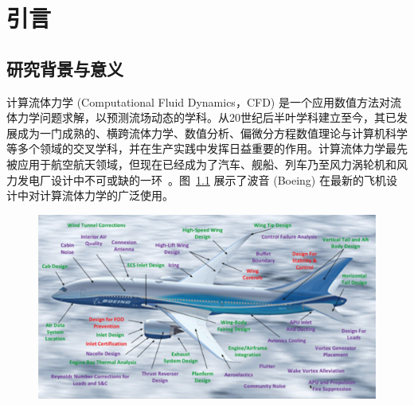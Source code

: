 \chapter{引言}
\label{chap:introduction}

\section{研究背景与意义}
\label{sec:background}
计算流体力学 (Computational Fluid Dynamics，CFD) 是一个应用数值方法对流体力学问题求解，以预测流场动态的学科。从20世纪后半叶学科建立至今，其已发展成为一门成熟的、横跨流体力学、数值分析、偏微分方程数值理论与计算机科学等多个领域的交叉学科，并在生产实践中发挥日益重要的作用。计算流体力学最先被应用于航空航天领域，但现在已经成为了汽车、舰船、列车乃至风力涡轮机和风力发电厂设计中不可或缺的一环~\citep{https://doi.org/10.1002/we.458}。图~\ref{img:cfd_impact_on_planes} 展示了波音 (Boeing) 在最新的飞机设计中对计算流体力学的广泛使用。

\begin{figure}[htbp]
    \centering
      \includegraphics[width=0.99\columnwidth]{figures/cfd_impact_on_planes.png}
    \label{img:cfd_impact_on_planes}
\end{figure}

